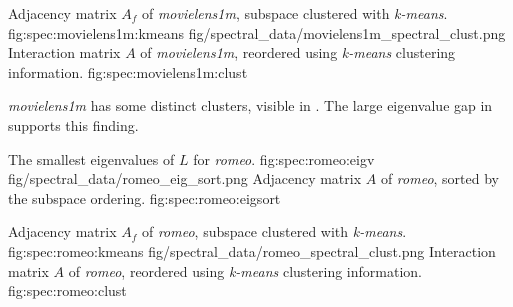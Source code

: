 {Adjacency matrix $A_f$ of \textit{movielens1m}, subspace clustered with \textit{k-means}.}
{fig:spec:movielens1m:kmeans}
{fig/spectral_data/movielens1m_spectral_clust.png}
{Interaction matrix $A$ of \textit{movielens1m}, reordered using \textit{k-means} clustering information.}
{fig:spec:movielens1m:clust}

\FloatBarrier

\textit{movielens1m} has some distinct clusters, visible in . The large eigenvalue gap in  supports this finding.

\FloatBarrier

{The smallest eigenvalues of $L$ for \textit{romeo}.}
{fig:spec:romeo:eigv}
{fig/spectral_data/romeo_eig_sort.png}
{Adjacency matrix $A$ of \textit{romeo}, sorted by the subspace ordering.}
{fig:spec:romeo:eigsort}

{Adjacency matrix $A_f$ of \textit{romeo}, subspace clustered with \textit{k-means}.}
{fig:spec:romeo:kmeans}
{fig/spectral_data/romeo_spectral_clust.png}
{Interaction matrix $A$ of \textit{romeo}, reordered using \textit{k-means} clustering information.}
{fig:spec:romeo:clust}

\FloatBarrier

\newpage
